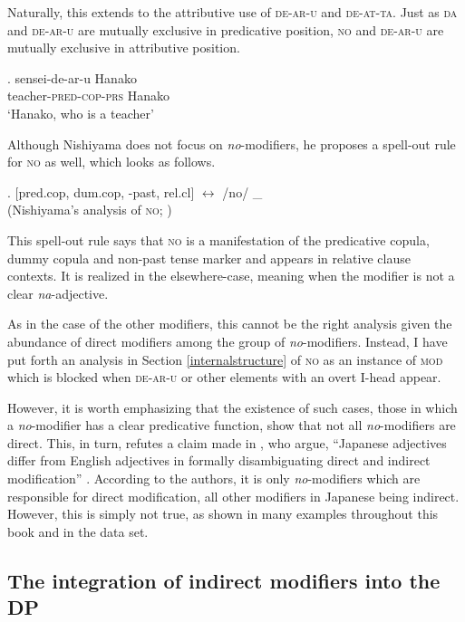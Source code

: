 Naturally, this extends to the attributive use of \textsc{de-ar-u} and \textsc{de-at-ta}. Just as \textsc{da} and \textsc{de-ar-u} are mutually exclusive in predicative position, \textsc{no} and \textsc{de-ar-u} are mutually exclusive in attributive position.

\exg. sensei-de-ar-u Hanako\\
teacher-\textsc{pred-cop-prs} Hanako\\
`Hanako, who is a teacher'

Although Nishiyama does not focus on \textit{no}-modifiers, he proposes a spell-out rule for \textsc{no} as well, which looks as follows.

\ex. [pred.cop, dum.cop, -past, rel.cl] $\leftrightarrow$ /no/ \_ \\ \null \hfill (Nishiyama’s analysis of \textsc{no}; \citealt[197]{nishiyama:1999:adj})

This spell-out rule says that \textsc{no} is a manifestation of the predicative copula, dummy copula and non-past tense marker and appears in relative clause contexts. It is realized in the elsewhere-case, meaning when the modifier is not a clear \textit{na}-adjective.

As in the case of the other modifiers, this cannot be the right analysis given the abundance of direct modifiers among the group of \textit{no}-modifiers. Instead, I have put forth an analysis in Section \ref{internalstructure} of \textsc{no} as an instance of \textsc{mod} which is blocked when \textsc{de-ar-u} or other elements with an overt I-head appear.

However, it is worth emphasizing that the existence of such cases, those in which a \textit{no}-modifier has a clear predicative function, show that not all \textit{no}-modifiers are direct. This, in turn, refutes a claim made in \citet{nagano:2015:RA}, who argue, ``Japanese adjectives differ from English adjectives in formally disambiguating direct and indirect modification'' \citep[124]{nagano:2015:RA}. According to the authors, it is only \textit{no}-modifiers which are responsible for direct modification, all other modifiers in Japanese being indirect. However, this is simply not true, as shown in many examples throughout this book and in the data set. %

\subsection{The integration of indirect modifiers into the DP}

